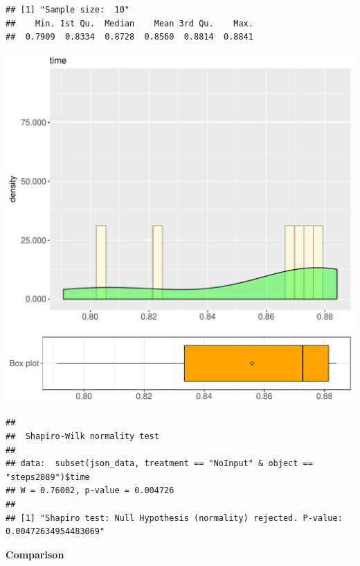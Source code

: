 \documentclass{article}\usepackage[]{graphicx}\usepackage[]{color}
\makeatletter
\def\maxwidth{ %
  \ifdim\Gin@nat@width>\linewidth
    \linewidth
  \else
    \Gin@nat@width
  \fi
}
\newenvironment{kframe}{%
 \def\at@end@of@kframe{}%
 \ifinner\ifhmode%
  \def\at@end@of@kframe{\end{minipage}}%
  \begin{minipage}{\columnwidth}%
 \fi\fi%
 \def\FrameCommand##1{\hskip\@totalleftmargin \hskip-\fboxsep
 \colorbox{shadecolor}{##1}\hskip-\fboxsep
     \hskip-\linewidth \hskip-\@totalleftmargin \hskip\columnwidth}%
 \MakeFramed {\advance\hsize-\width
   \@totalleftmargin\z@ \linewidth\hsize
   \@setminipage}}%
 {\par\unskip\endMakeFramed%
 \at@end@of@kframe}
\newenvironment{knitrout}{}{} %
\makeatother
\begin{document}
\begin{knitrout}
\color{fgcolor}\begin{kframe}
\begin{verbatim}
## [1] "Sample size:  10"
##    Min. 1st Qu.  Median    Mean 3rd Qu.    Max. 
##  0.7909  0.8334  0.8728  0.8560  0.8814  0.8841
\end{verbatim}
\end{kframe}
\includegraphics[width=\maxwidth]{figure/RH4_NoInput_steps2089-1} 
\begin{kframe}\begin{verbatim}
## 
## 	Shapiro-Wilk normality test
## 
## data:  subset(json_data, treatment == "NoInput" & object == "steps2089")$time
## W = 0.76002, p-value = 0.004726
## 
## [1] "Shapiro test: Null Hypothesis (normality) rejected. P-value: 0.00472634954483069"
\end{verbatim}
\end{kframe}
\end{knitrout}
  
 \textbf{Comparison}
  
\end{document}
